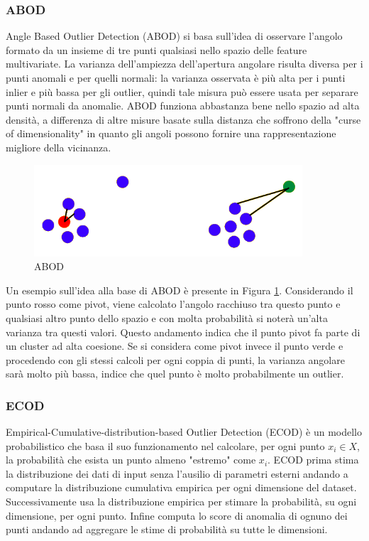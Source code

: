 \subsubsection{ABOD}
Angle Based Outlier Detection (ABOD) \cite{kriegel2008angle} si basa sull'idea di osservare l'angolo formato da un insieme di tre punti qualsiasi nello spazio delle feature multivariate. La varianza dell'ampiezza dell'apertura angolare risulta diversa per i punti anomali e per quelli normali: la varianza osservata è più alta per i punti inlier e più bassa per gli outlier, quindi tale misura può essere usata per separare punti normali da anomalie. ABOD funziona abbastanza bene nello spazio ad alta densità, a differenza di altre misure basate sulla distanza che soffrono della "curse of dimensionality" in quanto gli angoli possono fornire una rappresentazione migliore della vicinanza.
\begin{figure}[t]
	\centering
	\includegraphics[width=10cm, scale=1]{images/abod}
	\caption{ABOD}
	\label{abod}
\end{figure}
Un esempio sull'idea alla base di ABOD è presente in Figura \ref{abod}.
Considerando il punto rosso come pivot, viene calcolato l'angolo racchiuso tra questo punto e qualsiasi altro punto dello spazio e con molta probabilità si noterà un'alta varianza tra questi valori. Questo andamento indica che il punto pivot fa parte di un cluster ad alta coesione.
Se si considera come pivot invece il punto verde e procedendo con gli stessi calcoli per ogni coppia di punti, la varianza angolare sarà molto più bassa, indice che quel punto è molto probabilmente un outlier.

\subsubsection{ECOD}
Empirical-Cumulative-distribution-based Outlier Detection (ECOD) \cite{li2021ecod} è un modello probabilistico che basa il suo funzionamento nel calcolare, per ogni punto $x_i \in X$, la probabilità che esista un punto almeno "estremo" come $x_i$.
ECOD prima stima la distribuzione dei dati di input senza l'ausilio di parametri esterni andando a computare la distribuzione cumulativa empirica per ogni dimensione del dataset. Successivamente usa la distribuzione empirica per stimare la probabilità, su ogni dimensione, per ogni punto. Infine computa lo score di anomalia di ognuno dei punti andando ad aggregare le stime di probabilità su tutte le dimensioni.

